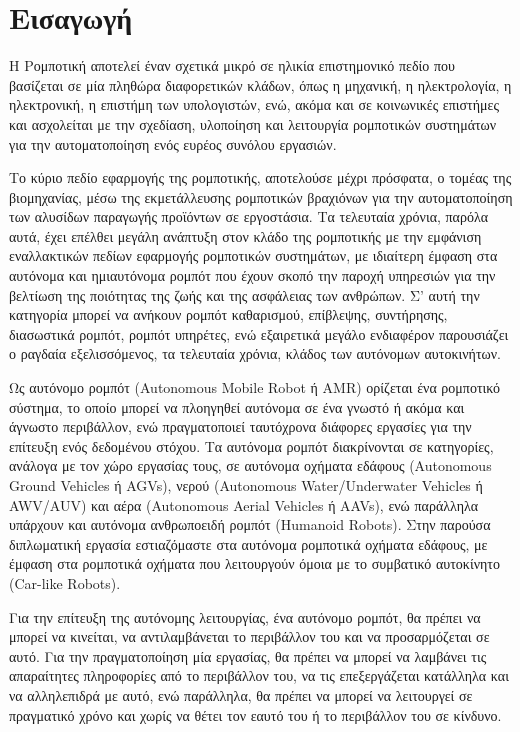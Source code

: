 \chapter{Εισαγωγή} \label{Chapter1}
Η Ρομποτική αποτελεί έναν σχετικά μικρό σε ηλικία επιστημονικό πεδίο που βασίζεται σε μία πληθώρα διαφορετικών κλάδων, όπως η μηχανική, η ηλεκτρολογία, η ηλεκτρονική, η επιστήμη των υπολογιστών, ενώ, ακόμα και σε κοινωνικές επιστήμες και ασχολείται με την σχεδίαση, υλοποίηση και λειτουργία ρομποτικών συστημάτων για την αυτοματοποίηση ενός ευρέος συνόλου εργασιών.

\bigskip
Το κύριο πεδίο εφαρμογής της ρομποτικής, αποτελούσε μέχρι πρόσφατα, ο τομέας της βιομηχανίας, μέσω της εκμετάλλευσης ρομποτικών βραχιόνων για την αυτοματοποίηση των αλυσίδων παραγωγής προϊόντων σε εργοστάσια. Τα τελευταία χρόνια, παρόλα αυτά, έχει επέλθει μεγάλη ανάπτυξη στον κλάδο της ρομποτικής με την εμφάνιση εναλλακτικών πεδίων εφαρμογής ρομποτικών συστημάτων, με ιδιαίτερη έμφαση στα αυτόνομα και ημιαυτόνομα ρομπότ που έχουν σκοπό την παροχή υπηρεσιών για την βελτίωση της ποιότητας της ζωής και της ασφάλειας των ανθρώπων. Σ' αυτή την κατηγορία μπορεί να ανήκουν ρομπότ καθαρισμού, επίβλεψης, συντήρησης, διασωστικά ρομπότ, ρομπότ υπηρέτες, ενώ εξαιρετικά μεγάλο ενδιαφέρον παρουσιάζει ο ραγδαία εξελισσόμενος, τα τελευταία χρόνια, κλάδος των αυτόνομων αυτοκινήτων.

\bigskip
Ως αυτόνομο ρομπότ (Autonomous Mobile Robot ή AMR) ορίζεται ένα ρομποτικό σύστημα, το οποίο μπορεί να πλοηγηθεί αυτόνομα σε ένα γνωστό ή ακόμα και άγνωστο περιβάλλον, ενώ πραγματοποιεί ταυτόχρονα διάφορες εργασίες για την επίτευξη ενός δεδομένου στόχου. Τα αυτόνομα ρομπότ διακρίνονται σε κατηγορίες, ανάλογα με τον χώρο εργασίας τους, σε αυτόνομα οχήματα εδάφους (Autonomous Ground Vehicles ή AGVs), νερού (Autonomous Water/Underwater Vehicles ή AWV/AUV) και αέρα (Autonomous Aerial Vehicles ή AAVs), ενώ παράλληλα υπάρχουν και αυτόνομα ανθρωποειδή ρομπότ (Humanoid Robots). Στην παρούσα διπλωματική εργασία εστιαζόμαστε στα αυτόνομα ρομποτικά οχήματα εδάφους, με έμφαση στα ρομποτικά οχήματα που λειτουργούν όμοια με το συμβατικό αυτοκίνητο (Car-like Robots).

\bigskip
Για την επίτευξη της αυτόνομης λειτουργίας, ένα αυτόνομο ρομπότ, θα πρέπει να μπορεί να κινείται, να αντιλαμβάνεται το περιβάλλον του και να προσαρμόζεται σε αυτό. Για την πραγματοποίηση μία εργασίας, θα πρέπει να μπορεί να λαμβάνει τις απαραίτητες πληροφορίες από το περιβάλλον του, να τις επεξεργάζεται κατάλληλα και να αλληλεπιδρά με αυτό, ενώ παράλληλα, θα πρέπει να μπορεί να λειτουργεί σε πραγματικό χρόνο και χωρίς να θέτει τον εαυτό του ή το περιβάλλον του σε κίνδυνο.

